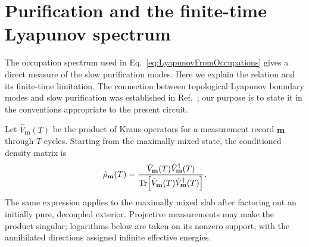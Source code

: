 \documentclass[aps,prb,10pt,twocolumn,superscriptaddress,longbibliography,floatfix]{revtex4-2}
\newcommand{\rec}{\mathbf m}   %
\begin{document}
{\color{blue}
\section{Purification and the finite-time Lyapunov spectrum}
\label{app:Lyapunov}

The occupation spectrum used in Eq.~\eqref{eq:LyapunovFromOccupations} gives a direct measure of the slow purification modes. Here we explain the relation and its finite-time limitation. The connection between topological Lyapunov boundary modes and slow purification was established in Ref.~\cite{XiaoKawabata2026}; our purpose is to state it in the conventions appropriate to the present circuit.

Let $\hat V_{\rec}(T)$ be the product of Kraus operators for a measurement record $\rec$ through $T$ cycles. Starting from the maximally mixed state, the conditioned density matrix is
\begin{equation}
    \hat\rho_{\rec}(T)=
    \frac{\hat V_{\rec}(T)\hat V_{\rec}^\dagger(T)}
    {\Tr[\hat V_{\rec}(T)\hat V_{\rec}^\dagger(T)]}.
    \label{eq:PurificationKrausProduct}
\end{equation}
The same expression applies to the maximally mixed slab after factoring out an initially pure, decoupled exterior. Projective measurements may make the product singular; logarithms below are taken on its nonzero support, with the annihilated directions assigned infinite effective energies.

}
\end{document}
